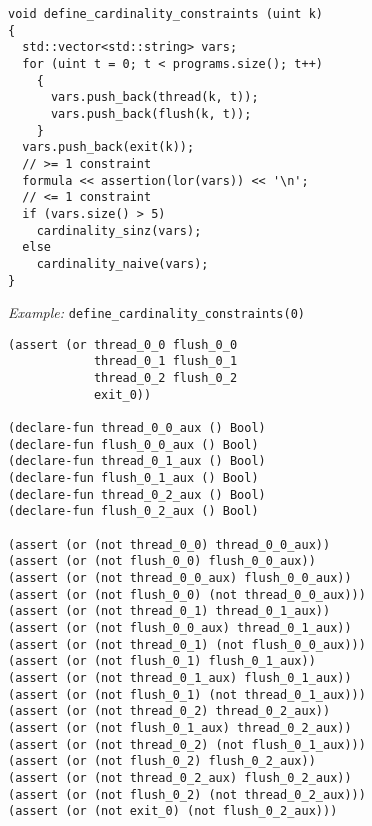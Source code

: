 \begin{lstlisting}[style=c++]
void define_cardinality_constraints (uint k)
{
  std::vector<std::string> vars;
  for (uint t = 0; t < programs.size(); t++)
    {
      vars.push_back(thread(k, t));
      vars.push_back(flush(k, t));
    }
  vars.push_back(exit(k));
  // >= 1 constraint
  formula << assertion(lor(vars)) << '\n';
  // <= 1 constraint
  if (vars.size() > 5)
    cardinality_sinz(vars);
  else
    cardinality_naive(vars);
}
\end{lstlisting}

\newpage

\noindent
\emph{Example:} \lstinline[style=c++]{define_cardinality_constraints(0)}

\begin{lstlisting}[language=smtlib]
(assert (or thread_0_0 flush_0_0
            thread_0_1 flush_0_1
            thread_0_2 flush_0_2
            exit_0))

(declare-fun thread_0_0_aux () Bool)
(declare-fun flush_0_0_aux () Bool)
(declare-fun thread_0_1_aux () Bool)
(declare-fun flush_0_1_aux () Bool)
(declare-fun thread_0_2_aux () Bool)
(declare-fun flush_0_2_aux () Bool)

(assert (or (not thread_0_0) thread_0_0_aux))
(assert (or (not flush_0_0) flush_0_0_aux))
(assert (or (not thread_0_0_aux) flush_0_0_aux))
(assert (or (not flush_0_0) (not thread_0_0_aux)))
(assert (or (not thread_0_1) thread_0_1_aux))
(assert (or (not flush_0_0_aux) thread_0_1_aux))
(assert (or (not thread_0_1) (not flush_0_0_aux)))
(assert (or (not flush_0_1) flush_0_1_aux))
(assert (or (not thread_0_1_aux) flush_0_1_aux))
(assert (or (not flush_0_1) (not thread_0_1_aux)))
(assert (or (not thread_0_2) thread_0_2_aux))
(assert (or (not flush_0_1_aux) thread_0_2_aux))
(assert (or (not thread_0_2) (not flush_0_1_aux)))
(assert (or (not flush_0_2) flush_0_2_aux))
(assert (or (not thread_0_2_aux) flush_0_2_aux))
(assert (or (not flush_0_2) (not thread_0_2_aux)))
(assert (or (not exit_0) (not flush_0_2_aux)))
\end{lstlisting}


